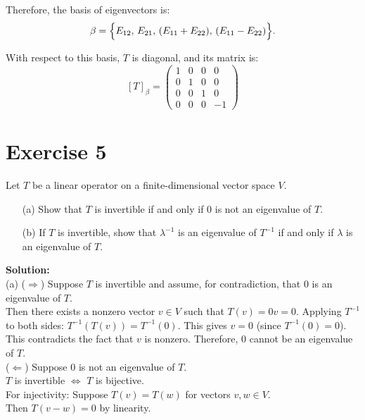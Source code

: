 \documentclass{article}
\begin{document}
Therefore, the basis of eigenvectors is:
\[
\beta = 
\Bigl\{
E_{12}, \, E_{21}, \, (E_{11} + E_{22}), \, (E_{11} - E_{22})
\Bigr\}.
\]

With respect to this basis, $T$ is diagonal, and its matrix is:
\[
[T]_{\beta}
=
\begin{pmatrix}
1 & 0 & 0 & 0 \\[4pt]
0 & 1 & 0 & 0 \\[4pt]
0 & 0 & 1 & 0 \\[4pt]
0 & 0 & 0 & -1
\end{pmatrix}
\]

\newpage

\section*{Exercise 5}
Let $T$ be a linear operator on a finite-dimensional vector space $V$.

\begin{enumerate}
    \item[(a)] Show that $T$ is invertible if and only if $0$ is not an eigenvalue of $T$.
    \item[(b)] If $T$ is invertible, show that $\lambda^{-1}$ is an eigenvalue of $T^{-1}$ if and only if $\lambda$ is an eigenvalue of $T$.
\end{enumerate}

\textbf{Solution:} \\

(a) ($\Rightarrow$) Suppose $T$ is invertible and assume, for contradiction, that $0$ is an eigenvalue of $T$. \\

Then there exists a nonzero vector $v \in V$ such that $T(v) = 0v = 0$. Applying $T^{-1}$ to both sides: $T^{-1}(T(v)) = T^{-1}(0)$. This gives $v = 0$ (since $T^{-1}(0) = 0$). \\

This contradicts the fact that $v$ is nonzero. Therefore, $0$ cannot be an eigenvalue of $T$. \\

($\Leftarrow$) Suppose $0$ is not an eigenvalue of $T$. \\

$T$ is invertible $\Leftrightarrow$ $T$ is bijective. \\

For injectivity: Suppose $T(v) = T(w)$ for vectors $v,w \in V$. \\

Then $T(v-w) = 0$ by linearity. \\
\end{document}
